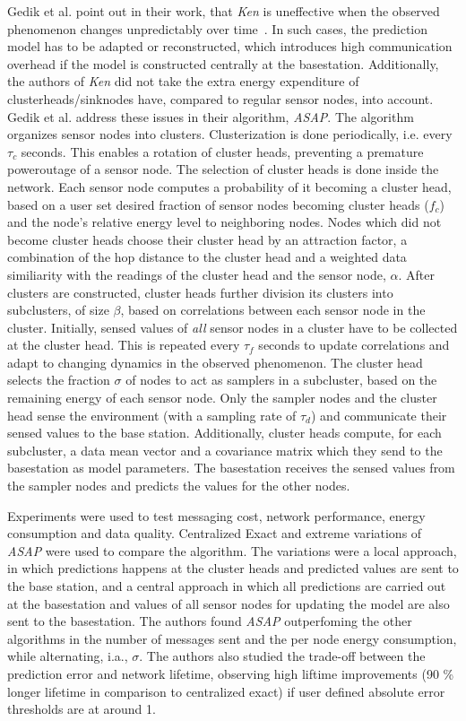 \par
Gedik et al. point out in their work, that \textit{Ken} is uneffective when the
observed phenomenon changes unpredictably over time~\cite{gedik2007asap}. In
such cases, the prediction model has to be adapted or reconstructed, which
introduces high communication overhead if the model is constructed centrally at
the basestation. Additionally, the authors of \textit{Ken} did not take the
extra energy expenditure of clusterheads/sinknodes have, compared to regular
sensor nodes, into account. Gedik et al. address these issues in their
algorithm, \textit{ASAP}. The algorithm organizes sensor nodes into clusters.
Clusterization is done periodically, i.e. every $ \tau_c $ seconds. This
enables a rotation of cluster heads, preventing a premature poweroutage of a
sensor node. The selection of cluster heads is done inside the network. Each
sensor node computes a probability of it becoming a cluster head, based on a
user set desired fraction of sensor nodes becoming cluster heads ($ f_c $) and
the node's relative energy level to neighboring nodes. Nodes which did not
become cluster heads choose their cluster head by an attraction factor, a
combination of the hop distance to the cluster head and a weighted data
similiarity with the readings of the cluster head and the sensor node, $ \alpha
$. After clusters are constructed, cluster heads further division its clusters
into subclusters, of size $ \beta $, based on correlations between each sensor
node in the cluster. Initially, sensed values of \textit{all} sensor nodes in a
cluster have to be collected at the cluster head. This is repeated every $
\tau_f $ seconds to update correlations and adapt to changing dynamics in the
observed phenomenon. The cluster head selects the fraction $ \sigma $ of nodes
to act as samplers in a subcluster, based on the remaining energy of each
sensor node. Only the sampler nodes and the cluster head sense the environment
(with a sampling rate of $ \tau_d $) and communicate their sensed values to the
base station. Additionally, cluster heads compute, for each subcluster, a data
mean vector and a covariance matrix which they send to the basestation as model
parameters. The basestation receives the sensed values from the sampler nodes
and predicts the values for the other nodes.

Experiments were used to test messaging cost, network performance, energy
consumption and data quality. Centralized Exact and extreme variations of
\textit{ASAP} were used to compare the algorithm. The variations were a local
approach, in which predictions happens at the cluster heads and predicted
values are sent to the base station, and a central approach in which all
predictions are carried out at the basestation and values of all sensor nodes
for updating the model are also sent to the basestation. The authors found
\textit{ASAP} outperfoming the other algorithms in the number of messages sent
and the per node energy consumption, while alternating, i.a., $ \sigma $. The
authors also studied the trade-off between the prediction error and network
lifetime, observing high liftime improvements (90 \% longer lifetime in
comparison to centralized exact) if user defined absolute error thresholds are
at around 1.

